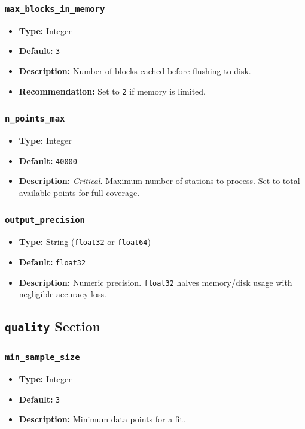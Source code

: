\documentclass[12pt,a4paper]{article}
\begin{document}
\subsubsection{\texttt{max\_blocks\_in\_memory}}
\begin{itemize}[leftmargin=*]
    \item \textbf{Type:} Integer
    \item \textbf{Default:} \texttt{3}
    \item \textbf{Description:} Number of blocks cached before flushing to disk.
    \item \textbf{Recommendation:} Set to \texttt{2} if memory is limited.
\end{itemize}
\subsubsection{\texttt{n\_points\_max}}
\begin{itemize}[leftmargin=*]
    \item \textbf{Type:} Integer
    \item \textbf{Default:} \texttt{40000}
    \item \textbf{Description:} \emph{Critical}. Maximum number of stations to process. Set to total available points for full coverage.
\end{itemize}
\subsubsection{\texttt{output\_precision}}
\begin{itemize}[leftmargin=*]
    \item \textbf{Type:} String (\texttt{float32} or \texttt{float64})
    \item \textbf{Default:} \texttt{float32}
    \item \textbf{Description:} Numeric precision. \texttt{float32} halves memory/disk usage with negligible accuracy loss.
\end{itemize}

\subsection{\texttt{quality} Section}
\subsubsection{\texttt{min\_sample\_size}}
\begin{itemize}[leftmargin=*]
    \item \textbf{Type:} Integer
    \item \textbf{Default:} \texttt{3}
    \item \textbf{Description:} Minimum data points for a fit.
\end{itemize}
\end{document}
